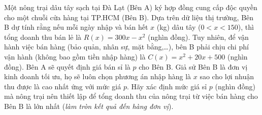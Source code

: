 \begin{ex}%
	Một nông trại dâu tây sạch tại Đà Lạt (Bên A) ký hợp đồng cung cấp độc quyền cho một chuỗi cửa hàng tại TP.HCM (Bên B). Dựa trên dữ liệu thị trường, Bên B dự tính rằng nếu mỗi ngày nhập và bán hết $x$ (kg) dâu tây ($0<x< 150$), thì tổng doanh thu bán lẻ là $R(x)=300x-x^2$ (nghìn đồng). Tuy nhiên, để vận hành việc bán hàng (bảo quản, nhân sự, mặt bằng,\ldots), bên B phải chịu chi phí vận hành (không bao gồm tiền nhập hàng) là $C(x)=x^2+20x+500$ (nghìn đồng). Bên A sẽ quyết định giá bán sỉ là $p$ cho Bên B. Giả sử Bên B là đơn vị kinh doanh tối ưu, họ sẽ luôn chọn phương án nhập hàng là $x$ sao cho lợi nhuận thu được là cao nhất ứng với mức giá $p$. Hãy xác định mức giá sỉ $p$ (nghìn đồng) mà nông trại nên thiết lập để tổng doanh thu của nông trại từ việc bán hàng cho Bên B là lớn nhất (\textit{làm tròn kết quả đến hàng đơn vị}).
	\par
\end{ex}

